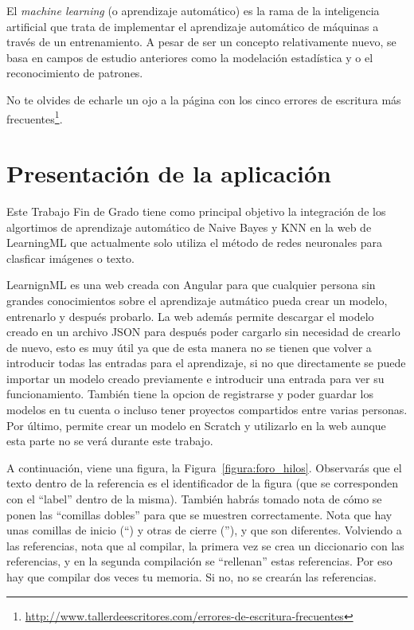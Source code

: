 \documentclass[a4paper, 12pt]{book}
\begin{document}
El \emph{machine learning} (o aprendizaje automático) es la rama de la inteligencia artificial que trata de implementar el aprendizaje automático de máquinas a través de un entrenamiento. A pesar de ser un concepto relativamente nuevo, se basa en campos de estudio anteriores como la modelación estadística y o el reconocimiento de patrones.

No te olvides de echarle un ojo a la página con los cinco errores de escritura más frecuentes\footnote{\url{http://www.tallerdeescritores.com/errores-de-escritura-frecuentes}}.

\section{Presentación de la aplicación}
\label{sec:presentacionaplicacion}

Este Trabajo Fin de Grado tiene como principal objetivo la integración de los algortimos de aprendizaje automático de Naive Bayes y KNN en la web de LearningML que actualmente solo utiliza el método de redes neuronales para clasficar imágenes o texto.

LearnignML es una web creada con Angular para que cualquier persona sin grandes conocimientos sobre el aprendizaje autmático pueda crear un modelo, entrenarlo y después probarlo. La web además permite descargar el modelo creado en un archivo JSON para después poder cargarlo sin necesidad de crearlo de nuevo, esto es muy útil ya que de esta manera no se tienen que volver a introducir todas las entradas para el aprendizaje, si no que directamente se puede importar un modelo creado previamente e introducir una entrada para ver su funcionamiento. También tiene la opcion de registrarse y poder guardar los modelos en tu cuenta o incluso tener proyectos compartidos entre varias personas. Por último, permite crear un modelo en Scratch y utilizarlo en la web aunque esta parte no se verá durante este trabajo.

A continuación, viene una figura, la Figura~\ref{figura:foro_hilos}. 
Observarás que el texto dentro de la referencia es el identificador de la figura (que se corresponden con el ``label'' dentro de la misma). 
También habrás tomado nota de cómo se ponen las ``comillas dobles'' para que se muestren correctamente. 
Nota que hay unas comillas de inicio (``) y otras de cierre (''), y que son diferentes.
Volviendo a las referencias, nota que al compilar, la primera vez se crea un diccionario con las referencias, y en la segunda compilación se ``rellenan'' estas referencias. 
Por eso hay que compilar dos veces tu memoria.
Si no, no se crearán las referencias.
\end{document}

